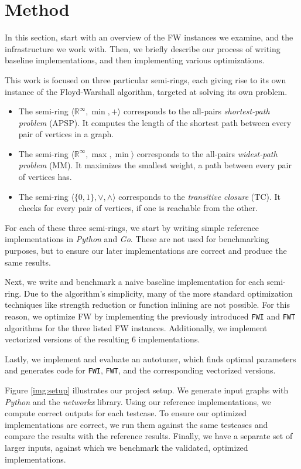 \section{Method}\label{sec:yourmethod}
In this section, start with an overview of the FW instances we examine, and the infrastructure we work with. Then, we briefly describe our process of writing baseline implementations, and then implementing various optimizations.

This work is focused on three particular semi-rings, each giving rise to its own instance of the Floyd-Warshall algorithm, targeted at solving its own problem.
\begin{itemize}
\item The semi-ring \(\langle \mathbb{R}^{\infty},\min,+\rangle\) corresponds to the all-pairs \emph{shortest-path problem} (APSP). It computes the length of the shortest path between every pair of vertices in a graph.
\item The semi-ring \(\langle \mathbb{R}^{\infty},\max,\min\rangle\) corresponds to the all-pairs \emph{widest-path problem} (MM). It maximizes the smallest weight, a path between every pair of vertices has.
\item The semi-ring \(\langle \{0, 1\},\lor,\land\rangle\) corresponds to the \emph{transitive closure} (TC). It checks for every pair of vertices, if one is reachable from the other.
\end{itemize}

For each of these three semi-rings, we start by writing simple reference implementations in \emph{Python} and \emph{Go}. These are not used for benchmarking purposes, but to ensure our later implementations are correct and produce the same results.

Next, we write and benchmark a naive baseline implementation for each semi-ring. Due to the algorithm's simplicity, many of the more standard optimization techniques like strength reduction or function inlining are not possible. For this reason, we optimize FW by implementing the previously introduced \texttt{FWI} and \texttt{FWT} algorithms for the three listed FW instances. Additionally, we implement vectorized versions of the resulting 6 implementations.

Lastly, we implement and evaluate an autotuner, which finds optimal parameters and generates code for \texttt{FWI}, \texttt{FWT}, and the corresponding vectorized versions.

Figure \ref{img:setup} illustrates our project setup. We generate input graphs with \emph{Python} and the \emph{networkx} library. Using our reference implementations, we compute correct outputs for each testcase.
To ensure our optimized implementations are correct, we run them against the same testcases and compare the results with the reference results.
Finally, we have a separate set of larger inputs, against which we benchmark the validated, optimized implementations.


